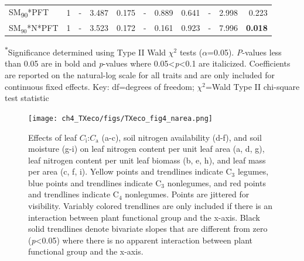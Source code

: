 \begin{landscape}
\begin{table}
{\begin{tabular}{p{3.75cm}p{0.5cm}p{1.75cm}p{1.5cm}p{1.5cm}p{1.75cm}p{1.5cm}p{1.5cm}p{1.75cm}p{1.5cm}p{1.5cm}}
            SM\textsubscript{90}*PFT & \multicolumn{1}{r}{1}
            & \multicolumn{1}{r}{-}             & \multicolumn{1}{r}{3.487}         & \multicolumn{1}{r}{0.175}
            & \multicolumn{1}{r}{-}             & \multicolumn{1}{r}{0.889}         & \multicolumn{1}{r}{0.641}
            & \multicolumn{1}{r}{-}             & \multicolumn{1}{r}{2.998}         & \multicolumn{1}{r}{0.223} 
            \\

            SM$_{90}$*N*PFT & \multicolumn{1}{r}{1}
            & \multicolumn{1}{r}{-}             & \multicolumn{1}{r}{3.523}         & \multicolumn{1}{r}{0.172}
            & \multicolumn{1}{r}{-}             & \multicolumn{1}{r}{0.161}         & \multicolumn{1}{r}{0.923}
            & \multicolumn{1}{r}{-}             & \multicolumn{1}{r}{7.996}         & \multicolumn{1}{r}{\textbf{0.018}}
            \\
            \hline

    \end{tabular}}
    \label{tab:table4.4}
\end{table}
\begin{singlespace}
    \noindent \textsuperscript{$*$}Significance determined using Type II Wald $\chi^{2}$ tests ($\alpha$=0.05). \textit{P}-values less than 0.05 are in bold and \textit{p}-values where 0.05<\textit{p}<0.1 are italicized. Coefficients are reported on the natural-log scale for all traits and are only included for continuous fixed effects. Key: df=degrees of freedom; $\chi^2$=Wald Type II chi-square test statistic
\end{singlespace}
\end{landscape}
\clearpage

\newpage
    \begin{figure}
        \centering
        \texttt{[image: ch4\_TXeco/figs/TXeco\_fig4\_narea.png]}
        \caption[Effects of leaf $C_\mathrm{i}$:$C_\mathrm{a}$, soil nitrogen availability, and soil moisture on leaf nitrogen content per unit leaf area, leaf nitrogen content per unit leaf biomass, and leaf mass per area.]{Effects of leaf $C_\mathrm{i}$:$C_\mathrm{a}$ (a-c), soil nitrogen availability (d-f), and soil moisture (g-i) on leaf nitrogen content per unit leaf area (a, d, g), leaf nitrogen content per unit leaf biomass (b, e, h), and leaf mass per area (c, f, i). Yellow points and trendlines indicate C$_3$ legumes, blue points and trendlines indicate C$_3$ nonlegumes, and red points and trendlines indicate C$_4$ nonlegumes. Points are jittered for visibility. Variably colored trendlines are only included if there is an interaction between plant functional group and the x-axis. Black solid trendlines denote bivariate slopes that are different from zero (\textit{p}<0.05) where there is no apparent interaction between plant functional group and the x-axis.}
        \label{fig:figure4.4}
    \end{figure}
\clearpage


